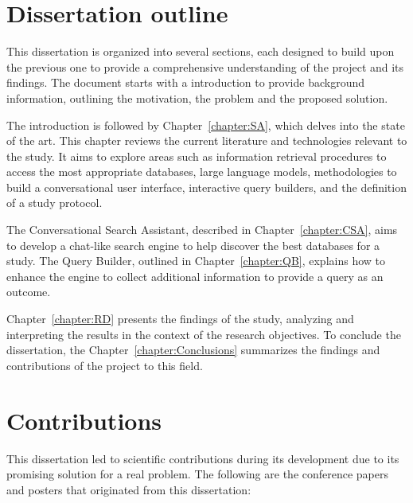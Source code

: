 \section{Dissertation outline}


This dissertation is organized into several sections, each designed to build upon the previous one to provide a comprehensive understanding of the project and its findings. The document starts with a introduction to provide background information, outlining the motivation, the problem and the proposed solution.

The introduction is followed by Chapter~\ref{chapter:SA}, which delves into the state of the art. This chapter reviews the current literature and technologies relevant to the study. It aims to explore areas such as information retrieval procedures to access the most appropriate databases, large language models, methodologies to build a conversational user interface, interactive query builders, and the definition of a study protocol.

The Conversational Search Assistant, described in Chapter~\ref{chapter:CSA}, aims to develop a chat-like search engine to help discover the best databases for a study. The Query Builder, outlined in Chapter~\ref{chapter:QB}, explains how to enhance the engine to collect additional information to provide a query as an outcome.

Chapter~\ref{chapter:RD} presents the findings of the study, analyzing and interpreting the results in the context of the research objectives. To conclude the dissertation, the Chapter~\ref{chapter:Conclusions} summarizes the findings and contributions of the project to this field.


\section{Contributions}

This dissertation led to scientific contributions during its development due to its promising solution for a real problem. The following are the conference papers and posters that originated from this dissertation:

